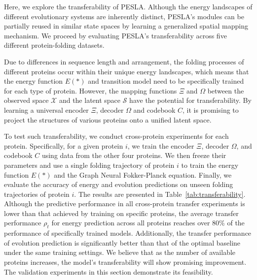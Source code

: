 Here, we explore the transferability of PESLA. Although the energy landscapes of different evolutionary systems are inherently distinct, PESLA’s modules can be partially reused in similar state spaces by learning a generalized spatial mapping mechanism. We proceed by evaluating PESLA’s transferability across five different protein-folding datasets.

Due to differences in sequence length and arrangement, the folding processes of different proteins occur within their unique energy landscapes, which means that the energy function $E(*)$ and transition model need to be specifically trained for each type of protein. However, the mapping functions $\Xi$ and $\Omega$ between the observed space $\mathcal{X}$ and the latent space $\mathcal{S}$ have the potential for transferability. By learning a universal encoder $\Xi$, decoder $\Omega$ and codebook $C$, it is promising to project the structures of various proteins onto a unified latent space.

To test such transferability, we conduct cross-protein experiments for each protein. Specifically, for a given protein $i$, we train the encoder $\Xi$, decoder $\Omega$, and codebook $C$ using data from the other four proteins. We then freeze their parameters and use a single folding trajectory of protein $i$ to train the energy function $E(*)$ and the Graph Neural Fokker-Planck equation. Finally, we evaluate the accuracy of energy and evolution predictions on unseen folding trajectories of protein $i$. The results are presented in Table~\ref{tab:transferability}. Although the predictive performance in all cross-protein transfer experiments is lower than that achieved by training on specific proteins, the average transfer performance $\rho_t$ for energy prediction across all proteins reaches over 80\% of the performance of specifically trained models.
Additionally, the transfer performance of evolution prediction is significantly better than that of the optimal baseline under the same training settings.
We believe that as the number of available proteins increases, the model’s transferability will show promising improvement. The validation experiments in this section demonstrate its feasibility.

